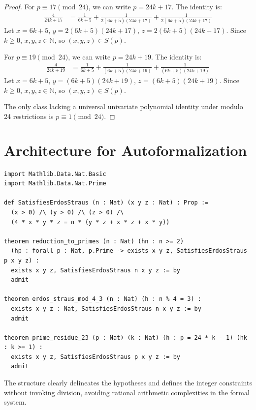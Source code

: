 \documentclass[12pt,a4paper]{article}
\begin{document}
\begin{proof}
For $p \equiv 17 \pmod{24}$, we can write $p = 24k + 17$. The identity is:
\begin{align}
\frac{4}{24k+17} &= \frac{1}{6k+5} + \frac{1}{2(6k+5)(24k+17)} + \frac{1}{2(6k+5)(24k+17)}
\end{align}
Let $x = 6k+5$, $y = 2(6k+5)(24k+17)$, $z = 2(6k+5)(24k+17)$. Since $k \ge 0$, $x,y,z \in \mathbb{N}$, so $(x,y,z) \in S(p)$.

For $p \equiv 19 \pmod{24}$, we can write $p = 24k + 19$. The identity is:
\begin{align}
\frac{4}{24k+19} &= \frac{1}{6k+5} + \frac{1}{(6k+5)(24k+19)} + \frac{1}{(6k+5)(24k+19)}
\end{align}
Let $x = 6k+5$, $y = (6k+5)(24k+19)$, $z = (6k+5)(24k+19)$. Since $k \ge 0$, $x,y,z \in \mathbb{N}$, so $(x,y,z) \in S(p)$.

The only class lacking a universal univariate polynomial identity under modulo 24 restrictions is $p \equiv 1 \pmod{24}$.
\end{proof}

\section{Architecture for Autoformalization}

\begin{lstlisting}[basicstyle=\ttfamily\small, breaklines=true]
import Mathlib.Data.Nat.Basic
import Mathlib.Data.Nat.Prime

def SatisfiesErdosStraus (n : Nat) (x y z : Nat) : Prop :=
  (x > 0) /\ (y > 0) /\ (z > 0) /\
  (4 * x * y * z = n * (y * z + x * z + x * y))

theorem reduction_to_primes (n : Nat) (hn : n >= 2)
  (hp : forall p : Nat, p.Prime -> exists x y z, SatisfiesErdosStraus p x y z) :
  exists x y z, SatisfiesErdosStraus n x y z := by
  admit

theorem erdos_straus_mod_4_3 (n : Nat) (h : n % 4 = 3) :
  exists x y z : Nat, SatisfiesErdosStraus n x y z := by
  admit

theorem prime_residue_23 (p : Nat) (k : Nat) (h : p = 24 * k - 1) (hk : k >= 1) :
  exists x y z, SatisfiesErdosStraus p x y z := by
  admit
\end{lstlisting}

The structure clearly delineates the hypotheses and defines the integer constraints without invoking division, avoiding rational arithmetic complexities in the formal system.
\end{document}
